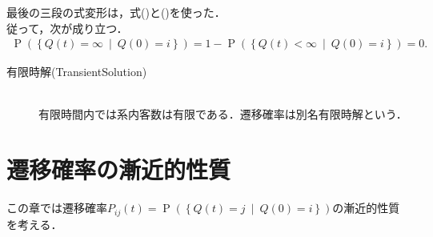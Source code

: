 \documentclass[a4j,papersize,disablejfam,slide,14pt]{jsarticle}
\def\cprob#1#2{\operatorname{P} \left(\left\{ #1 \ \middle|\ #2 \right\}\right)} %
\begin{document}
    最後の三段の式変形は，式()と()を使った．\\
    従って，次が成り立つ．
    \begin{align}
    	\cprob{Q(t) = \infty}{Q(0)=i} = 1 - \cprob{Q(t) < \infty}{Q(0)=i} = 0.
    \end{align}
    \begin{screen}
    	\begin{description}
    		\item[有限時解{\rm (Transient\quad Solution)}]\mbox{}\\
            	有限時間内では系内客数は有限である．遷移確率は別名有限時解という．
    	\end{description}
    \end{screen}

\section{遷移確率の漸近的性質}
	この章では遷移確率$P_{ij}(t) = \cprob{Q(t) = j}{Q(0)=i}$の漸近的性質を考える．
\end{document}
